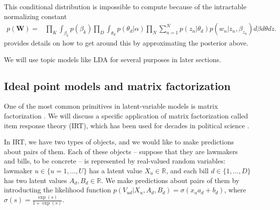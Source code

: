 This conditional distribution is impossible to compute because of the
intractable normalizing constant
\begin{align} 
  p(\bm W) = & \prod_K \int_{\beta_k} p(\beta_k)
  \prod_D \int_{\theta_d} p(\theta_d | \alpha) \prod_N \sum_{n=1}^N p(z_n | \theta_d) p(w_n | z_n, \beta_{z_n}) d\beta d\theta dz.
\end{align}
 provides details on how to get around
this by approximating the posterior above.

We will use topic models like LDA for several purposes in later
sections.



\subsection{Ideal point models and matrix factorization}

One of the most common primitives in latent-variable models is matrix
factorization \cite{salakhutdinov:2008a}. We will discuss a specific
application of matrix factorization called item response theory (IRT),
which has been used for decades in political science
\cite{clinton:2004,martin:2002,poole:1991,enelow:1984,albert:1992}.

In IRT, we have two types of objects, and we would like to make
predictions about pairs of them.  Each of these objects -- suppose
that they are lawmakers and bills, to be concrete -- is represented by
real-valued random variables: lawmaker $u \in \{ u=1, \ldots, U \}$
has a latent value $X_u \in \mathbb{R}$, and each bill $d \in \{ 1,
\ldots, D \}$ has two latent values $A_d,B_d \in \mathbb{R}$.  We make
predictions about pairs of them by introducting the likelihood
function $p(V_{ud} | X_u, A_d, B_d) = \sigma( x_u a_d + b_d )$, where
$\sigma(s) = \frac{\exp(s)}{ 1 + \exp(s) }$.

